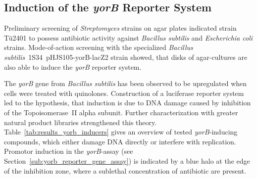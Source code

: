 


\subsection{Induction of the \textit{yorB} Reporter System} %
\label{sub:induction_of_the_yorb_reporter_system}

Preliminary screening of \emph{Streptomyces} strains on agar plates indicated strain Tü2401 to possess antibiotic activity against \emph{Bacillus subtilis} and \emph{Escherichia coli} strains.
Mode-of-action screening with the specialized \textit{Bacillus subtilis}~1S34~pHJS105-yorB-lacZ2 strain showed, that disks of agar-cultures are also able to induce the \emph{yorB} reporter system.

The \textit{yorB} gene from \textit{Bacillus subtilis} has been observed to be upregulated when cells were treated with quinolones.\autocite{Hutter2004a}
Construction of a luciferase reporter system led to the hypothesis, that induction is due to DNA damage caused by inhibition of the Topoisomerase~II alpha subunit.\autocite{Hutter2004}
Further characterization with greater natural product libraries strengthened this theory.\autocite{Mariner2011,Urban2007}
Table~\ref{tab:results_yorb_inducers} gives an overview of tested \textit{yorB}-inducing compounds, which either damage DNA directly or interfere with replication.
Promotor induction in the \emph{yorB}-assay (see Section~\ref{sub:yorb_reporter_gene_assay}) is indicated by a blue halo at the edge of the inhibition zone, where a sublethal concentration of antibiotic are present.


